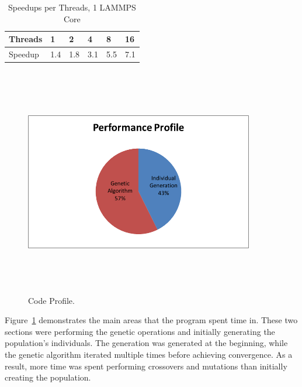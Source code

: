 \documentclass[letterpaper, 12pt]{article}
\begin{document}
\begin{flushleft}
\begin{table}[ht]
	\centering
	\caption{Speedups per Threads, 1 LAMMPS Core}
	\label{speedups1core}
	\begin{tabular}{|l|l|l|l|l|l|}
		\hline
		Threads           	& 1  & 2 & 4 & 8 & 16					\\
		\hline
		Speedup 			& 1.4 & 1.8 & 3.1 & 5.5 & 7.1			\\ 
		\hline
	\end{tabular}
\end{table}

\begin{figure}[H]
	\centering
	\includegraphics[width=10cm,height=10cm,keepaspectratio]{profile.png}
	\caption[Profiling]{Code Profile.}
	\label{fig:codeprofile}
\end{figure}

Figure~\ref{fig:codeprofile} demonstrates the main areas that the program spent time in.  These two sections were performing the genetic operations and initially generating the population's individuals.  The generation was generated at the beginning, while the genetic algorithm iterated multiple times before achieving convergence.  As a result, more time was spent performing crossovers and mutations than initially creating the population. \\


\end{flushleft}
\end{document}
